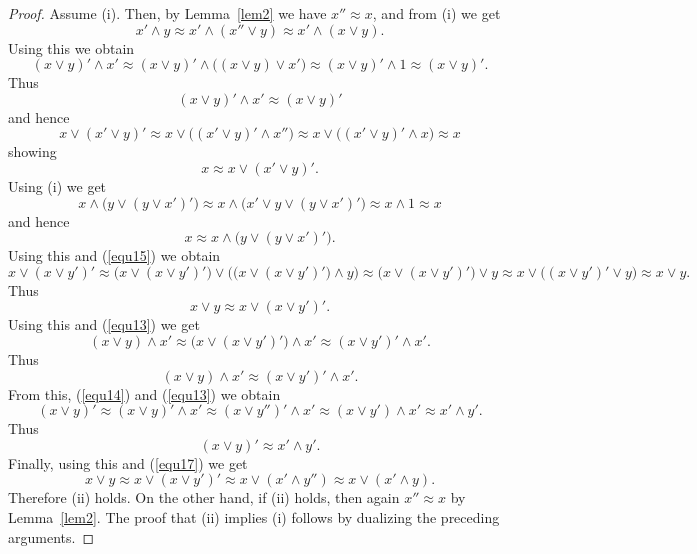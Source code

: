 \documentclass[10pt,a4paper]{amsart}
\begin{document}
\begin{proof}
Assume (i). Then, by Lemma~\ref{lem2} we have $x''\approx x$, and from (i) we get
\begin{equation}\label{equ13}
x'\wedge y\approx x'\wedge(x''\vee y)\approx x'\wedge(x\vee y).
\end{equation}
Using this we obtain
\[
(x\vee y)'\wedge x'\approx(x\vee y)'\wedge\big((x\vee y)\vee x'\big)\approx(x\vee y)'\wedge1\approx(x\vee y)'.
\]
Thus
\begin{equation}\label{equ14}
(x\vee y)'\wedge x'\approx(x\vee y)'
\end{equation}
and hence
\[
x\vee(x'\vee y)'\approx x\vee\big((x'\vee y)'\wedge x''\big)\approx x\vee\big((x'\vee y)'\wedge x\big)\approx x
\]
showing
\begin{equation}\label{equ15}
x\approx x\vee(x'\vee y)'.
\end{equation}
Using (i) we get
\[
x\wedge\big(y\vee(y\vee x')'\big)\approx x\wedge\big(x'\vee y\vee(y\vee x')'\big)\approx x\wedge1\approx x
\]
and hence
\[
x\approx x\wedge\big(y\vee(y\vee x')'\big).
\]
Using this and (\ref{equ15}) we obtain
\[
x\vee(x\vee y')'\approx\big(x\vee(x\vee y')'\big)\vee\Big(\big(x\vee(x\vee y')'\big)\wedge y\Big)\approx\big(x\vee(x\vee y')'\big)\vee y\approx x\vee\big((x\vee y')'\vee y\big)\approx x\vee y.
\]
Thus
\begin{equation}\label{equ17}
x\vee y\approx x\vee(x\vee y')'.
\end{equation}
Using this and (\ref{equ13}) we get
\[
(x\vee y)\wedge x'\approx\big(x\vee(x\vee y')'\big)\wedge x'\approx(x\vee y')'\wedge x'.
\]
Thus
\[
(x\vee y)\wedge x'\approx(x\vee y')'\wedge x'.
\]
From this, (\ref{equ14}) and (\ref{equ13}) we obtain
\[
(x\vee y)'\approx(x\vee y)'\wedge x'\approx(x\vee y'')'\wedge x'\approx(x\vee y')\wedge x'\approx x'\wedge y'.
\]
Thus
\[
(x\vee y)'\approx x'\wedge y'.
\]
Finally, using this and (\ref{equ17}) we get
\[
x\vee y\approx x\vee(x\vee y')'\approx x\vee(x'\wedge y'')\approx x\vee(x'\wedge y).
\]
Therefore (ii) holds. On the other hand, if (ii) holds, then again $x''\approx x$ by Lemma~\ref{lem2}. The proof that (ii) implies (i) follows by dualizing the preceding arguments.
\end{proof}
\end{document}

